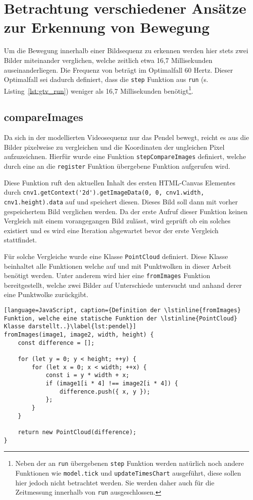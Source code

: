 \section{Betrachtung verschiedener Ansätze zur Erkennung von Bewegung} \label{ch:erkennung_von_änderungen}

Um die Bewegung innerhalb einer Bildsequenz zu erkennen werden hier stets zwei Bilder miteinander verglichen, welche zeitlich etwa 16,7 Millisekunden auseinanderliegen.
Die Frequenz von  beträgt im Optimalfall 60 Hertz.
Dieser Optimalfall sei dadurch definiert, dass die \lstinline{step} Funktion aus \lstinline{run} (s. Listing~\ref{lst:gtv_run}) weniger als 16,7 Millisekunden benötigt\footnote{Neben der an \lstinline{run} übergebenen \lstinline{step} Funktion werden natürlich noch andere Funktionen wie \lstinline{model.tick} und \lstinline{updateTimesChart} ausgeführt, diese sollen hier jedoch nicht betrachtet werden. Sie werden daher auch für die Zeitmessung innerhalb von \lstinline{run} ausgeschlossen.}.

\subsection{compareImages}

Da sich in der modellierten Videosequenz nur das Pendel bewegt, reicht es aus die Bilder pixelweise zu vergleichen und die Koordinaten der ungleichen Pixel aufzuzeichnen.
Hierfür wurde eine Funktion \lstinline{stepCompareImages} definiert, welche durch eine an die \lstinline{register} Funktion übergebene Funktion aufgerufen wird.

Diese Funktion ruft den aktuellen Inhalt des ersten HTML-Canvas Elementes durch \lstinline{cnv1.getContext('2d').getImageData(0, 0, cnv1.width, cnv1.height).data} auf und speichert diesen.
Dieses Bild soll dann mit vorher gespeichertem Bild verglichen werden.
Da der erste Aufruf dieser Funktion keinen Vergleich mit einem vorangegangen Bild zulässt, wird geprüft ob ein solches existiert und es wird eine Iteration abgewartet bevor der erste Vergleich stattfindet.

Für solche Vergleiche wurde eine Klasse \lstinline{PointCloud} definiert.
Diese Klasse beinhaltet alle Funktionen welche auf und mit Punktwolken in dieser Arbeit benötigt werden.
Unter anderem wird hier eine \lstinline{fromImages} Funktion bereitgestellt, welche zwei Bilder auf Unterschiede untersucht und anhand derer eine Punktwolke zurückgibt.

\begin{lstlisting}[language=JavaScript, caption={Definition der \lstinline{fromImages} Funktion, welche eine statische Funktion der \lstinline{PointCloud} Klasse darstellt..}\label{lst:pendel}]
fromImages(image1, image2, width, height) {
    const difference = [];

    for (let y = 0; y < height; ++y) {
        for (let x = 0; x < width; ++x) {
            const i = y * width + x;
            if (image1[i * 4] !== image2[i * 4]) {
                difference.push({ x, y });
            };
        }
    }

    return new PointCloud(difference);
}
\end{lstlisting}

